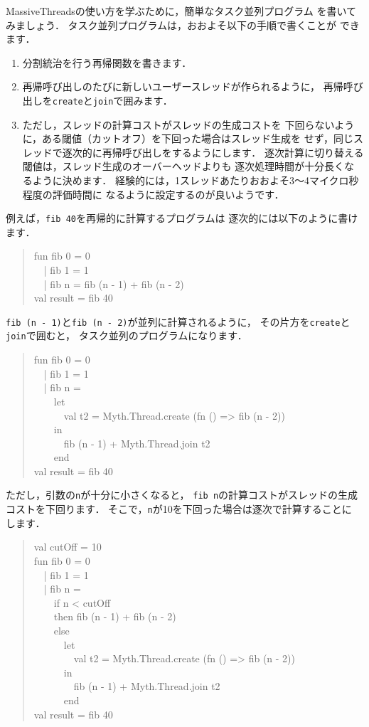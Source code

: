 \documentclass{jbook}
\newenvironment{program}{\begin{quote}\begin{tt}}%
                        {\end{tt}\end{quote}}
\begin{document}
	MassiveThreadsの使い方を学ぶために，簡単なタスク並列プログラム
を書いてみましょう．
	タスク並列プログラムは，おおよそ以下の手順で書くことが
できます．
\begin{enumerate}
\item
	分割統治を行う再帰関数を書きます．
\item
	再帰呼び出しのたびに新しいユーザースレッドが作られるように，
再帰呼び出しを{\tt create}と{\tt join}で囲みます．
\item
	ただし，スレッドの計算コストがスレッドの生成コストを
下回らないように，ある閾値（カットオフ）を下回った場合はスレッド生成を
せず，同じスレッドで逐次的に再帰呼び出しをするようにします．
	逐次計算に切り替える閾値は，スレッド生成のオーバーヘッドよりも
逐次処理時間が十分長くなるように決めます．
	経験的には，1スレッドあたりおおよそ3〜4マイクロ秒程度の評価時間に
なるように設定するのが良いようです．
\end{enumerate}
        例えば，{\tt fib 40}を再帰的に計算するプログラムは
逐次的には以下のように書けます．
\begin{program}
fun fib 0 = 0\\
\ \ | fib 1 = 1\\
\ \ | fib n = fib (n - 1) + fib (n - 2)\\
val result = fib 40
\end{program}
	{\tt fib (n - 1)}と{\tt fib (n - 2)}が並列に計算されるように，
その片方を{\tt create}と{\tt join}で囲むと，
タスク並列のプログラムになります．
\begin{program}
fun fib 0 = 0\\
\ \ | fib 1 = 1\\
\ \ | fib n =\\
\ \ \ \ let\\
\ \ \ \ \ \ val t2 = Myth.Thread.create (fn () => fib (n - 2))\\
\ \ \ \ in\\
\ \ \ \ \ \ fib (n - 1) + Myth.Thread.join t2\\
\ \ \ \ end\\
val result = fib 40
\end{program}
	ただし，引数の{\tt n}が十分に小さくなると，
{\tt fib n}の計算コストがスレッドの生成コストを下回ります．
	そこで，{\tt n}が10を下回った場合は逐次で計算することに
します．
\begin{program}
val cutOff = 10\\
fun fib 0 = 0\\
\ \ | fib 1 = 1\\
\ \ | fib n =\\
\ \ \ \ if n < cutOff\\
\ \ \ \ then fib (n - 1) + fib (n - 2)\\
\ \ \ \ else\\
\ \ \ \ \ \ let\\
\ \ \ \ \ \ \ \ val t2 = Myth.Thread.create (fn () => fib (n - 2))\\
\ \ \ \ \ \ in\\
\ \ \ \ \ \ \ \ fib (n - 1) + Myth.Thread.join t2\\
\ \ \ \ \ \ end\\
val result = fib 40
\end{program}
\end{document}
